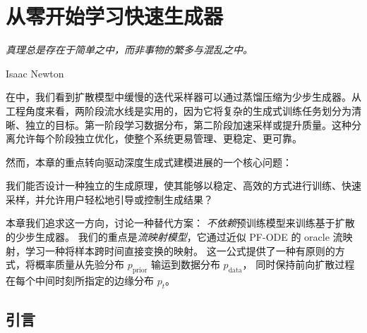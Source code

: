 \chapter{从零开始学习快速生成器}\label{ch:fast-scratch}

\epigraph{
    \textit{真理总是存在于简单之中，而非事物的繁多与混乱之中。
}}{Isaac Newton}


在中，我们看到扩散模型中缓慢的迭代采样器可以通过蒸馏压缩为少步生成器。从工程角度来看，两阶段流水线是实用的，因为它将复杂的生成式训练任务划分为清晰、独立的目标。第一阶段学习数据分布，第二阶段加速采样或提升质量。这种分离允许每个阶段独立优化，使整个系统更易管理、更稳定、更可靠。

然而，本章的重点转向驱动深度生成式建模进展的一个核心问题：
\begin{question}
    我们能否设计一种独立的生成原理，使其能够以稳定、高效的方式进行训练、快速采样，并允许用户轻松地引导或控制生成结果？
\end{question}
本章我们追求这一方向，讨论一种替代方案：
\emph{不依赖}预训练模型来训练基于扩散的少步生成器。
我们的重点是\emph{流映射模型}，它通过近似 PF-ODE 的 oracle 流映射，学习一种将样本跨时间直接变换的映射。
这一公式提供了一种有原则的方式，将概率质量从先验分布 $p_{\mathrm{prior}}$ 输运到数据分布 $p_{\mathrm{data}}$，
同时保持前向扩散过程在每个中间时刻所指定的边缘分布 $p_t$。


\newpage

\section{引言}

